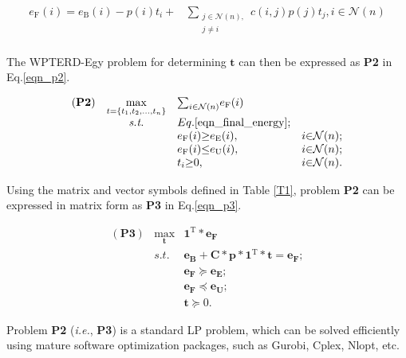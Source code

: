 \documentclass[12pt,journal,onecolumn,draftcls]{IEEEtran}
\begin{document}
\begin{equation}
\label{eqn_final_energy}
\begin{array}{rl}
e_\text{F}(i){=}e_\text{B}(i){-}p(i)t_i
{+}&\mathop{\sum}\limits_{\substack{j{\in}\mathcal{N}(n),\\j{\neq}i}}
c(i,j)p(j)t_j,i{\in}\mathcal{N}(n)\\
\end{array}
\end{equation}

The WPTERD-Egy problem for determining $\mathbf{t}$ can then be expressed as \textbf{P2} in Eq.\eqref{eqn_p2}.

\begin{equation}
\label{eqn_p2}
\begin{array}{rcll}
(\textbf{P2})&\mathop{\max}\limits_{t{=}\{t_1,t_2,\ldots,t_n\}}&{\sum}_{i{\in}\mathcal{N}(n)}e_\text{F}(i)\\
&\textit{s.t.}
&Eq.\eqref{eqn_final_energy};&\\
&&e_\text{F}(i){\geq}e_\text{E}(i),&i{\in}\mathcal{N}(n);\\
&&e_\text{F}(i){\leq}e_\text{U}(i),&i{\in}\mathcal{N}(n);\\
&&t_i{\geq}0,&i{\in}\mathcal{N}(n).
\end{array}
\end{equation}

Using the matrix and vector symbols defined in Table \ref{T1}, problem \textbf{P2} can be expressed in matrix form as \textbf{P3} in Eq.\eqref{eqn_p3}.

\begin{equation}
\label{eqn_p3}
\begin{array}{rcl}
(\textbf{P3})&\mathop{\max}\limits_{\mathbf{t}}&\mathbf{1}^\text{T}{*}\mathbf{e_\text{F}}\\
&\textit{s.t.}
&\mathbf{e_\text{B}}{+}\mathbf{C}{*}\mathbf{p}{*}\mathbf{1}^{\text{T}}{*}\mathbf{t}{=}\mathbf{e_\text{F}};\\
&&\mathbf{e_\text{F}}{\succeq}\mathbf{e_\text{E}};\\
&&\mathbf{e_\text{F}}{\preceq}\mathbf{e_\text{U}};\\
&&\mathbf{t}{\succeq}0.
\end{array}
\end{equation}

Problem \textbf{P2} (\textit{i.e.}, \textbf{P3}) is a standard LP problem, which can be solved efficiently using mature software optimization packages, such as Gurobi, Cplex, Nlopt, etc.
\end{document}
